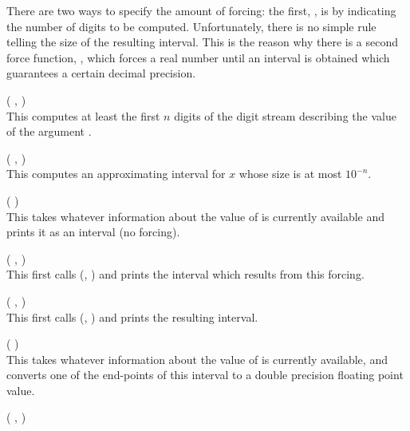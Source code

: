 \documentclass[a4paper,12pt]{article}
\newenvironment{funlist}{\begin{list}%
   {}%
   {\topsep=0pt%
        \leftmargin=0cm%
        \rightmargin=0cm%
        \listparindent=0cm%
        \parskip=10pt%
        \partopsep=0pt%
        \itemsep=0pt%
        \parsep=0pt}}%
   {\end{list}}
\begin{document}
There are two ways to specify the amount of forcing:
the first, ,
is by indicating the number of digits to be computed.
Unfortunately, there is no simple rule telling
the size of the resulting interval.
This is the reason why there is a second force function, ,
which forces a real number until an interval is obtained
which guarantees a certain decimal precision.

\begin{funlist}
\item {} (%
 ,  )\\
This computes at least the first $n$ digits
of the digit stream describing the value of the argument .
\vspace{1ex}
%
\item {} (%
 ,  )\\
This computes an approximating interval for $x$
whose size is at most $10^{-n}$.
\vspace{1ex}
%
\item {} ( )\\
This takes whatever information about the value of 
is currently available and prints it as an interval (no forcing).
\vspace{1ex}
%
\item {} ( ,  )\\
This first calls (, )
and prints the interval which results from this forcing.
\vspace{1ex}
%
\item {} ( ,  )\\
This first calls (, )
and prints the resulting interval.
\vspace{1ex}
%
\item {} ( )\\
This takes whatever information about the value of  is currently available,
and converts one of the end-points of this interval
to a double precision floating point value.
\vspace{1ex}
%
\item {} (%
 ,  )\\

\end{funlist}
\end{document}
